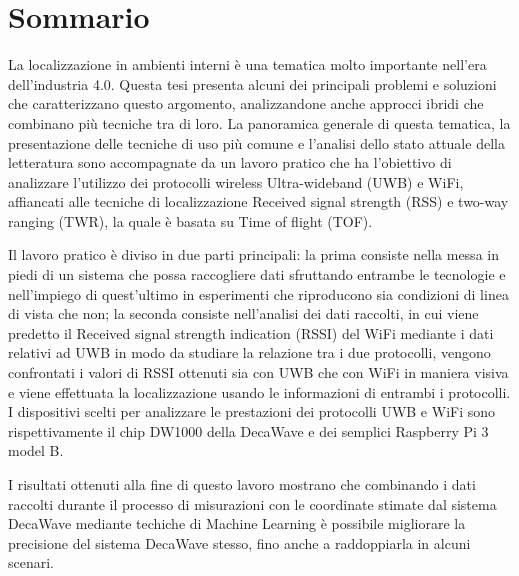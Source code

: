 \chapter*{Sommario}
La localizzazione in ambienti interni è una tematica molto importante nell'era
dell'industria 4.0.
Questa tesi presenta alcuni dei principali problemi e soluzioni che caratterizzano questo
argomento, analizzandone anche approcci ibridi che combinano più tecniche tra di loro.
La panoramica generale di questa tematica, la presentazione delle tecniche di uso
più comune e l'analisi dello stato attuale della letteratura sono
accompagnate da un lavoro pratico che ha l'obiettivo di analizzare l'utilizzo dei protocolli
wireless Ultra-wideband (UWB) e WiFi, affiancati alle tecniche di localizzazione
Received signal strength (RSS) e two-way ranging (TWR), la quale è basata su Time of flight (TOF).

Il lavoro pratico è diviso in due parti principali: la prima consiste nella messa in piedi
di un sistema che possa raccogliere dati sfruttando entrambe le tecnologie e
nell'impiego di quest'ultimo in esperimenti che riproducono sia condizioni di linea di vista che non;
la seconda consiste nell'analisi dei dati raccolti, in cui
viene predetto il Received signal strength indication (RSSI) del WiFi mediante i dati relativi ad UWB in modo da studiare
la relazione tra i due protocolli, vengono confrontati i valori di RSSI ottenuti
sia con UWB che con WiFi in maniera visiva e viene effettuata la
localizzazione usando le informazioni di entrambi i protocolli.
I dispositivi scelti per analizzare le prestazioni dei protocolli UWB e WiFi
sono rispettivamente il chip DW1000 della DecaWave e dei semplici Raspberry Pi 3 model B.

I risultati ottenuti alla fine di questo lavoro mostrano che combinando i dati
raccolti durante il processo di misurazioni con le coordinate stimate dal sistema
DecaWave mediante techiche di Machine Learning è possibile
migliorare la precisione del sistema DecaWave stesso, fino anche a raddoppiarla in alcuni scenari.

\endgroup
